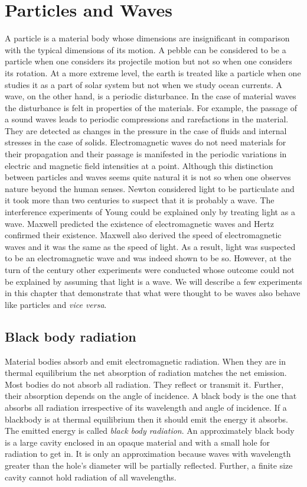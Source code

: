 \chapter{Particles and Waves}\label{c2}
A particle is a material body whose dimensions are insignificant in comparison
with the typical dimensions of its motion. A pebble can be considered to be a
particle when one considers its projectile motion but not so when one considers
its rotation. At a more extreme level, the earth is treated like a particle when
one studies it as a part of solar system but not when we study ocean currents.
A wave, on the other hand, is a periodic disturbance. In the case of material
waves the disturbance is felt in properties of the materials. For example, the
passage of a sound waves leads to periodic compressions and rarefactions in the
material. They are detected as changes in the pressure in the case of fluids and
internal stresses in the case of solids. Electromagnetic waves do not need 
materials for their propagation and their passage is manifested in the periodic
variations in electric and magnetic field intensities at a point. Although this
distinction between particles and waves seems quite natural it is not so when 
one observes nature beyond the human senses. Newton considered light to be
particulate and it took more than two centuries to suspect that it is probably
a wave. The interference experiments of Young could be explained only by 
treating light as a wave. Maxwell predicted the existence of electromagnetic
waves and Hertz confirmed their existence. Maxwell also derived the speed of
electromagnetic waves and it was the same as the speed of light. As a result,
light was suspected to be an electromagnetic wave and was indeed shown to be so.
However, at the turn of the century other experiments were conducted whose 
outcome could not be explained by assuming that light is a wave. We will 
describe a few experiments in this chapter that demonstrate that what were
thought to be waves also behave like particles and \emph{vice versa}.

\section{Black body radiation}\label{c2s1}
Material bodies absorb and emit electromagnetic radiation. When they are in
thermal equilibrium the net absorption of radiation matches the net emission.
Most bodies do not absorb all radiation. They reflect or transmit it. Further,
their absorption depends on the angle of incidence. A black body is the one 
that absorbs all radiation irrespective of its wavelength and angle of 
incidence. If a blackbody is at thermal equilibrium then it should emit the
energy it absorbs. The emitted energy is called \emph{black body radiation}.
An approximately black body is a large cavity enclosed in an opaque material 
and with a small hole for radiation to get in. It is only an approximation 
because waves with wavelength greater than the hole's diameter will be 
partially reflected. Further, a finite size cavity cannot hold radiation of all
wavelengths.

